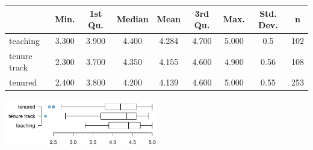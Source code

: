 \documentclass[12pt]{article}
\begin{document}
{\small
\begin{center}
\begin{tabular}{l | c | c | c | c | c | c | c | c}
		& Min. & 1st Qu. & Median  &  Mean & 3rd Qu. &   Max. & Std. Dev. & n \\
\hline
teaching	&  3.300 &  3.900  & 4.400&   4.284 &  4.700&   5.000 	& 0.5 & 102 \\
tenure track	& 2.300 &  3.700 &  4.350  & 4.155 &  4.600  & 4.900 & 0.56 & 108 \\
tenured 	&   2.400   & 3.800 &  4.200  & 4.139  & 4.600 &  5.000  & 0.55 & 253
\end{tabular}
\includegraphics[width=0.5\textwidth]{figures/evals_rank}
\end{center}
}

%
\end{document}
